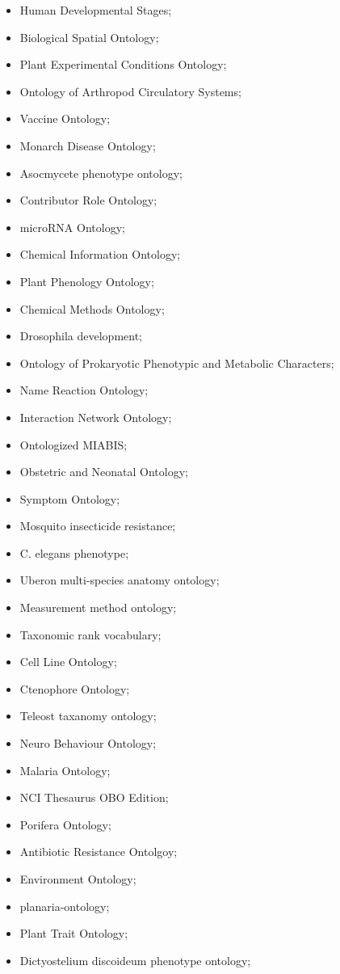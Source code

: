 \documentclass{cisfyp}
\begin{document}
\begin{appendices}
\begin{multicols}{2}
\begin{itemize}
	\item Human Developmental Stages; \item Biological Spatial Ontology; \item Plant Experimental Conditions Ontology; \item Ontology of Arthropod Circulatory Systems; \item Vaccine Ontology; \item Monarch Disease Ontology; \item Asocmycete phenotype ontology; \item Contributor Role Ontology; 
	\item microRNA Ontology; \item Chemical Information Ontology; \item Plant Phenology Ontology; \item Chemical Methods Ontology; \item Drosophila development; \item Ontology of Prokaryotic Phenotypic and Metabolic Characters; \item Name Reaction Ontology; \item Interaction Network Ontology; 
	\item Ontologized MIABIS; \item Obstetric and Neonatal Ontology; \item Symptom Ontology; \item Mosquito insecticide resistance; \item C. elegans phenotype; \item Uberon multi-species anatomy ontology; \item Measurement method ontology; \item Taxonomic rank vocabulary; \item Cell Line Ontology; \item Ctenophore Ontology;
	\item Teleost taxanomy ontology; \item Neuro Behaviour Ontology; \item Malaria Ontology; \item NCI Thesaurus OBO Edition; \item Porifera Ontology; \item Antibiotic Resistance Ontolgoy; \item Environment Ontology; \item planaria-ontology; \item Plant Trait Ontology; \item Dictyostelium discoideum phenotype ontology;

\end{itemize}
\end{multicols}
\end{appendices}
\end{document}

